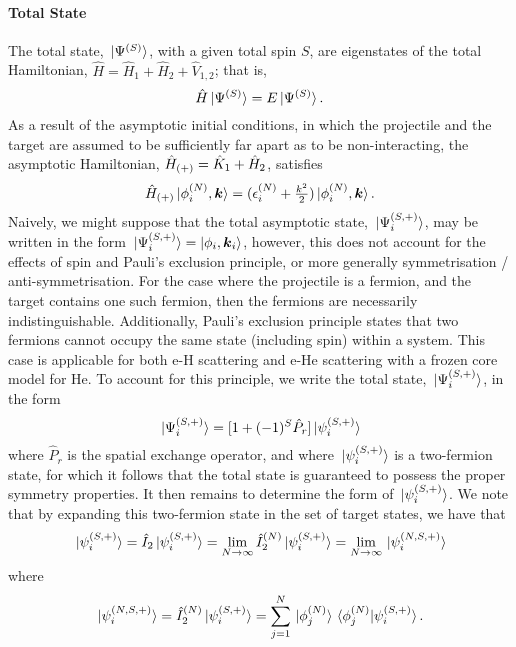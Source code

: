 \documentclass[draft]{article}
\begin{document}
\paragraph{Total State}

The total state, $\ket*{\Psi^{(S)}}$, with a given total spin $S$, are
eigenstates of the total Hamiltonian,
$\hat{H} = \hat{H}_{1} + \hat{H}_{2} + \hat{V}_{1, 2}$; that is,
\begin{equation}
  \label{eq:total-hamiltonian}
  \hat{H}
  \ket*{\Psi^{(S)}}
  =
  E
  \ket*{\Psi^{(S)}}
  .
\end{equation}
As a result of the asymptotic initial conditions, in which the projectile and
the target are assumed to be sufficiently far apart as to be non-interacting,
the asymptotic Hamiltonian, $\hat{H}_{(+)} = \hat{K}_{1} + \hat{H}_{2}$,
satisfies
\begin{equation}
  \label{eq:total-asymptotic-hamiltonian}
  \hat{H}_{(+)}
  \ket*{\phi_{i}^{(N)}, \boldsymbol{k}}
  =
  (
    \epsilon_{i}^{(N)}
    +
    \tfrac{k^{2}}{2}
  )
  \ket*{\phi_{i}^{(N)}, \boldsymbol{k}}
  .
\end{equation}
Naively, we might suppose that the total asymptotic state,
$\ket*{\Psi_{i}^{(S, +)}}$, may be written in the form
$\ket*{\Psi_{i}^{(S, +)}} = \ket{\phi_{i}, \boldsymbol{k}_{i}}$,
however, this does not account for the effects of spin and Pauli's exclusion
principle, or more generally symmetrisation / anti-symmetrisation.
For the case where the projectile is a fermion, and the target contains one such
fermion, then the fermions are necessarily indistinguishable.
Additionally, Pauli's exclusion principle states that two fermions cannot occupy
the same state (including spin) within a system.
This case is applicable for both e-H scattering and e-He scattering with a
frozen core model for He.
To account for this principle, we write the total state,
$\ket*{\Psi_{i}^{(S, +)}}$, in the form
\begin{equation}
  \label{eq:total-state-symmetrisation}
  \ket*{\Psi_{i}^{(S, +)}}
  =
  [
    1
    +
    (-1)^{S}
    \hat{P}_{r}
  ]
  \ket*{\psi_{i}^{(S, +)}}
\end{equation}
where $\hat{P}_{r}$ is the spatial exchange operator, and where
$\ket*{\psi_{i}^{(S, +)}}$ is a two-fermion state, for which it follows that the
total state is guaranteed to possess the proper symmetry properties.
It then remains to determine the form of $\ket*{\psi_{i}^{(S, +)}}$.
We note that by expanding this two-fermion state in the set of target states, we
have that
\begin{equation}
  \label{eq:target-expansion}
  \ket*{\psi_{i}^{(S, +)}}
  =
  \hat{I}_{2}
  \ket*{\psi_{i}^{(S, +)}}
  =
  \lim_{N \to \infty}
  \hat{I}_{2}^{(N)}
  \ket*{\psi_{i}^{(S, +)}}
  =
  \lim_{N \to \infty}
  \ket*{\psi_{i}^{(N, S, +)}}
\end{equation}
where
\begin{equation}
  \label{eq:2}
  \ket*{\psi_{i}^{(N, S, +)}}
  =
  \hat{I}_{2}^{(N)}
  \ket*{\psi_{i}^{(S, +)}}
  =
  \sum_{j = 1}^{N}
  \ket*{\phi_{j}^{(N)}}
  \bra*{\phi_{j}^{(N)}}
  \ket*{\psi_{i}^{(S, +)}}
  .
\end{equation}
\end{document}
